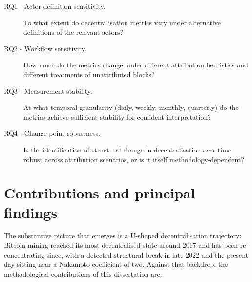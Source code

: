 \documentclass[logo,msc]{infthesis}           %
\begin{document}
\begin{description}
  \item[RQ1 - Actor-definition sensitivity.] To what extent do
    decentralisation metrics vary under alternative definitions of the relevant
    actors?
  \item[RQ2 - Workflow sensitivity.] How much do the metrics change under
    different attribution heuristics and different treatments of unattributed
    blocks?
  \item[RQ3 - Measurement stability.] At what temporal granularity (daily,
    weekly, monthly, quarterly) do the metrics achieve sufficient stability for
    confident interpretation?
  \item[RQ4 - Change-point robustness.] Is the identification of structural
    change in decentralisation over time robust across attribution scenarios,
    or is it itself methodology-dependent?
\end{description}
 
\section{Contributions and principal findings}
\label{sec:intro-contributions}
 
The substantive picture that emerges is a U-shaped decentralisation
trajectory: Bitcoin mining reached its most decentralised state around 2017
and has been re-concentrating since, with a detected structural break in late
2022 and the present day sitting near a Nakamoto coefficient of two. Against that backdrop, the methodological
contributions of this dissertation are:
 
\end{document}
